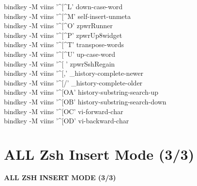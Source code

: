 \documentclass[11pt,a4paper,twoside]{book}
\begin{document}
bindkey -M viins '\textasciicircum{}[\textasciicircum{}L' down-case-word\\
bindkey -M viins '\textasciicircum{}[\textasciicircum{}M' self-insert-unmeta\\
bindkey -M viins '\textasciicircum{}[\textasciicircum{}O' zpwrRunner\\
bindkey -M viins '\textasciicircum{}[\textasciicircum{}P' zpwrUp8widget\\
bindkey -M viins '\textasciicircum{}[\textasciicircum{}T' transpose-words\\
bindkey -M viins '\textasciicircum{}[\textasciicircum{}U' up-case-word\\
bindkey -M viins '\textasciicircum{}[ ' zpwrSshRegain\\
bindkey -M viins '\textasciicircum{}[,' \_history-complete-newer\\
bindkey -M viins '\textasciicircum{}[/' \_history-complete-older\\
bindkey -M viins '\textasciicircum{}[OA' history-substring-search-up\\
bindkey -M viins '\textasciicircum{}[OB' history-substring-search-down\\
bindkey -M viins '\textasciicircum{}[OC' vi-forward-char\\
bindkey -M viins '\textasciicircum{}[OD' vi-backward-char\\


\vspace{16pt}

\section{ALL Zsh Insert Mode (3/3)}


\vspace{10pt}
{\large\bfseries\color{neoncyan} ALL ZSH INSERT MODE (3/3)}\vspace{6pt}
\end{document}
